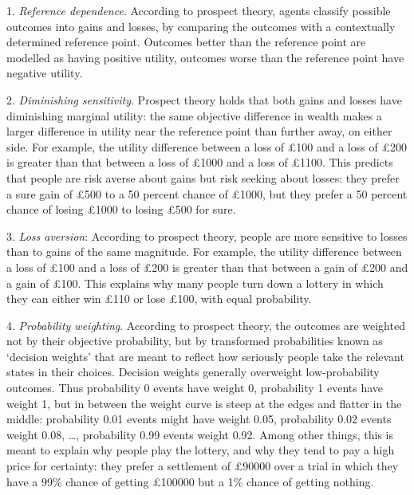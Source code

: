 1. \emph{Reference dependence}. According to prospect theory, agents
classify possible outcomes into gains and losses, by comparing the
outcomes with a contextually determined reference point. Outcomes
better than the reference point are modelled as having positive
utility, outcomes worse than the reference point have negative
utility.

2. \emph{Diminishing sensitivity}. Prospect theory holds that both
gains and losses have diminishing marginal utility: the same objective
difference in wealth makes a larger difference in utility near the
reference point than further away, on either side. For example, the
utility difference between a loss of £100 and a loss of £200 is
greater than that between a loss of £1000 and a loss of £1100. This
predicts that people are risk averse about gains but risk seeking
about losses: they prefer a sure gain of £500 to a 50 percent chance
of £1000, but they prefer a 50 percent chance of losing £1000 to
losing £500 for sure.

3. \emph{Loss aversion}: According to prospect theory, people are
more sensitive to losses than to gains of the same magnitude. For
example, the utility difference between a loss of £100 and a loss of
£200 is greater than that between a gain of £200 and a gain of
£100. This explains why many people turn down a lottery in which they
can either win £110 or lose £100, with equal probability.

4. \emph{Probability weighting}. According to prospect theory, the
outcomes are weighted not by their objective probability, but by
transformed probabilities known as `decision weights' that are meant
to reflect how seriously people take the relevant states in their
choices. Decision weights generally overweight low-probability
outcomes. Thus probability 0 events have weight 0, probability 1
events have weight 1, but in between the weight curve is steep at the edges
and flatter in the middle: probability 0.01 events might have weight
0.05, probability 0.02 events weight 0.08, \ldots, probability 0.99
events weight 0.92. Among other things, this is meant to explain why
people play the lottery, and why they tend to pay a high price for
certainty: they prefer a settlement of £90000 over a trial in which
they have a 99\% chance of getting £100000 but a 1\% chance of
getting nothing.%


